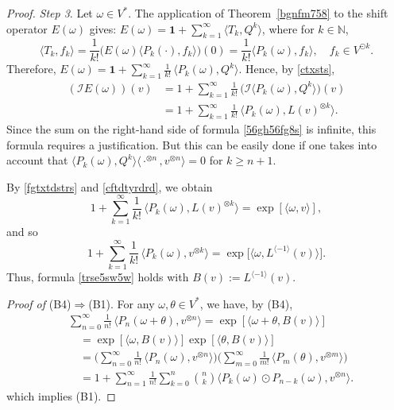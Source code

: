\documentclass[12pt]{article}
\theoremstyle{remark}
\theoremstyle{remark}
\theoremstyle{remark}
\begin{document}
\begin{proof}
 {\it Step 3}. Let $\omega\in V^*$. The application of Theorem~\ref{bgnfm758} to the shift operator $E(\omega)$ gives: $E(\omega) = \mathbf 1+ \sum_{k=1}^\infty \langle T_k,Q^{k}\rangle$,
where for $k\in\mathbb N$, 
\[\langle T_k, f_k\rangle =\frac{1}{k!}\big(E(\omega)\langle P_k(\cdot),f_k\rangle\big)(0)=\frac{1}{k!}\langle P_k(\omega),f_k\rangle, \quad f_k\in V^{\odot k}.\]
Therefore, $E(\omega) = \mathbf 1+ \sum_{k=1}^\infty\frac1{k!}\,\langle P_k(\omega), Q^{k}\rangle$.
Hence, by \eqref{ctxsts},
\begin{align}
(\mathcal IE(\omega))(v)& =  1+ \sum_{k=1}^\infty \frac1{k!}\,\big(\mathcal I
\langle P_k(\omega), Q^{k}\rangle \big)(v)\label{56gh56fg8s}\\
& =  1+ \sum_{k=1}^\infty \frac1{k!}\,\langle P_k(\omega),L(v)^{\otimes k}\rangle.
\label{cftdtyrdrd}
\end{align}
Since the sum on the right-hand side of formula \eqref{56gh56fg8s} is infinite, this formula requires a justification.  But this can be easily done  if one takes into account that $\langle P_k(\omega), Q^{k}\rangle \langle \cdot^{\otimes n},v^{\otimes n}\rangle=0$ for $k\ge n+1$. 

By \eqref{fgtxtdstrs} and \eqref{cftdtyrdrd}, we obtain 
$$1+ \sum_{k=1}^\infty \frac1{k!}\,\langle P_k(\omega),L(v)^{\otimes k}\rangle= \exp[\langle\omega,v\rangle],$$
and so 
$$1+ \sum_{k=1}^\infty \frac1{k!}\,\langle P_k(\omega),v^{\otimes k}\rangle= \exp\big[\langle\omega,L^{\langle-1\rangle}(v)\rangle\big].$$
Thus, formula \eqref{trse5sw5w} holds with $B(v):=L^{\langle-1\rangle}(v)$. 



{\it Proof of\/} (B4)$\Rightarrow$(B1). For any $\omega,\theta\in V^*$, we have, by (B4),
\begin{align*}
&\sum_{n=0}^\infty \frac{1}{n!}\,\langle P_n(\omega+\theta),v^{\otimes n}\rangle=\exp[\langle \omega+\theta, B(v)\rangle]\\
&\quad =\exp[\langle \omega, B(v)\rangle]\exp[\langle \theta, B(v)\rangle]\\
&\quad=\bigg(\sum_{n=0}^\infty \frac{1}{n!}\,\langle P_n(\omega),v^{\otimes n}\rangle\bigg)\bigg(\sum_{m=0}^\infty \frac{1}{m!}\,\langle P_m(\theta),v^{\otimes m}\rangle\bigg)\\
&\quad=1+\sum_{n=1}^\infty \frac1{n!}\sum_{k=0}^n {n \choose k}\big\langle P_k(\omega)\odot P_{n-k}(\omega), v^{\otimes n}\big\rangle.
\end{align*}
which implies (B1). 


\end{proof}
\end{document}
